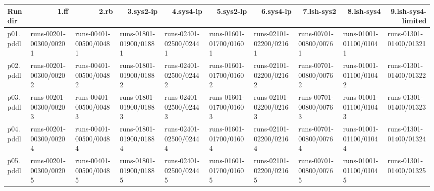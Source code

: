 \documentclass{article}
\begin{document}
\begin{tabular}{@{}lrrrrrrrrr@{}}
Run dir & 1.ff & 2.rb & 3.sys2-ip & 4.sys4-ip & 5.sys2-lp & 6.sys4-lp & 7.lsh-sys2 & 8.lsh-sys4 & 9.lsh-sys4-limited \\
\midrule
p01.pddl & \multicolumn{1}{|l|}{runs-00201-00300/00201} & \multicolumn{1}{|l|}{runs-00401-00500/00481} & \multicolumn{1}{|l|}{runs-01801-01900/01881} & \multicolumn{1}{|l|}{runs-02401-02500/02441} & \multicolumn{1}{|l|}{runs-01601-01700/01601} & \multicolumn{1}{|l|}{runs-02101-02200/02161} & \multicolumn{1}{|l|}{runs-00701-00800/00761} & \multicolumn{1}{|l|}{runs-01001-01100/01041} & \multicolumn{1}{|l|}{runs-01301-01400/01321} \\
p02.pddl & \multicolumn{1}{|l|}{runs-00201-00300/00202} & \multicolumn{1}{|l|}{runs-00401-00500/00482} & \multicolumn{1}{|l|}{runs-01801-01900/01882} & \multicolumn{1}{|l|}{runs-02401-02500/02442} & \multicolumn{1}{|l|}{runs-01601-01700/01602} & \multicolumn{1}{|l|}{runs-02101-02200/02162} & \multicolumn{1}{|l|}{runs-00701-00800/00762} & \multicolumn{1}{|l|}{runs-01001-01100/01042} & \multicolumn{1}{|l|}{runs-01301-01400/01322} \\
p03.pddl & \multicolumn{1}{|l|}{runs-00201-00300/00203} & \multicolumn{1}{|l|}{runs-00401-00500/00483} & \multicolumn{1}{|l|}{runs-01801-01900/01883} & \multicolumn{1}{|l|}{runs-02401-02500/02443} & \multicolumn{1}{|l|}{runs-01601-01700/01603} & \multicolumn{1}{|l|}{runs-02101-02200/02163} & \multicolumn{1}{|l|}{runs-00701-00800/00763} & \multicolumn{1}{|l|}{runs-01001-01100/01043} & \multicolumn{1}{|l|}{runs-01301-01400/01323} \\
p04.pddl & \multicolumn{1}{|l|}{runs-00201-00300/00204} & \multicolumn{1}{|l|}{runs-00401-00500/00484} & \multicolumn{1}{|l|}{runs-01801-01900/01884} & \multicolumn{1}{|l|}{runs-02401-02500/02444} & \multicolumn{1}{|l|}{runs-01601-01700/01604} & \multicolumn{1}{|l|}{runs-02101-02200/02164} & \multicolumn{1}{|l|}{runs-00701-00800/00764} & \multicolumn{1}{|l|}{runs-01001-01100/01044} & \multicolumn{1}{|l|}{runs-01301-01400/01324} \\
p05.pddl & \multicolumn{1}{|l|}{runs-00201-00300/00205} & \multicolumn{1}{|l|}{runs-00401-00500/00485} & \multicolumn{1}{|l|}{runs-01801-01900/01885} & \multicolumn{1}{|l|}{runs-02401-02500/02445} & \multicolumn{1}{|l|}{runs-01601-01700/01605} & \multicolumn{1}{|l|}{runs-02101-02200/02165} & \multicolumn{1}{|l|}{runs-00701-00800/00765} & \multicolumn{1}{|l|}{runs-01001-01100/01045} & \multicolumn{1}{|l|}{runs-01301-01400/01325} \\

\end{tabular}
\end{document}
